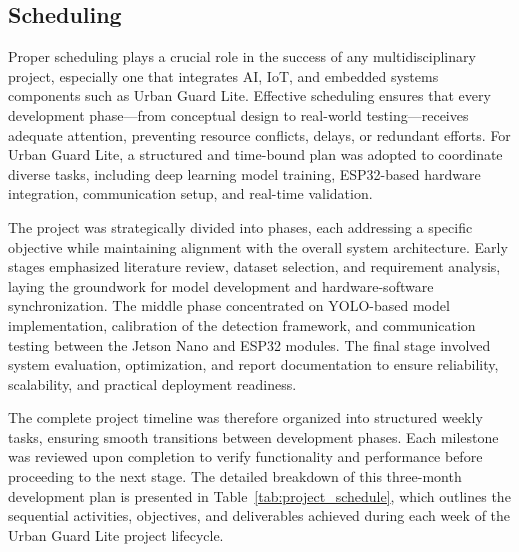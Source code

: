\documentclass[a4paper, 12pt]{report}
\begin{document}
\subsection{Scheduling}
Proper scheduling plays a crucial role in the success of any multidisciplinary project, especially one that integrates AI, IoT, and embedded systems components such as Urban Guard Lite. Effective scheduling ensures that every development phase—from conceptual design to real-world testing—receives adequate attention, preventing resource conflicts, delays, or redundant efforts. For Urban Guard Lite, a structured and time-bound plan was adopted to coordinate diverse tasks, including deep learning model training, ESP32-based hardware integration, communication setup, and real-time validation.

The project was strategically divided into phases, each addressing a specific objective while maintaining alignment with the overall system architecture. Early stages emphasized literature review, dataset selection, and requirement analysis, laying the groundwork for model development and hardware-software synchronization. The middle phase concentrated on YOLO-based model implementation, calibration of the detection framework, and communication testing between the Jetson Nano and ESP32 modules. The final stage involved system evaluation, optimization, and report documentation to ensure reliability, scalability, and practical deployment readiness.

The complete project timeline was therefore organized into structured weekly tasks, ensuring smooth transitions between development phases. Each milestone was reviewed upon completion to verify functionality and performance before proceeding to the next stage. The detailed breakdown of this three-month development plan is presented in Table~\ref{tab:project_schedule}, which outlines the sequential activities, objectives, and deliverables achieved during each week of the Urban Guard Lite project lifecycle.
\end{document}
